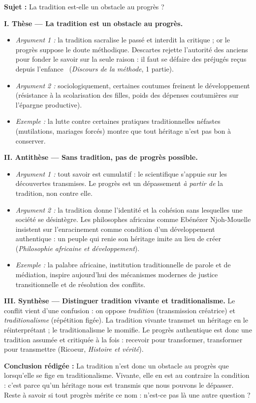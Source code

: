 \documentclass[11pt]{article}
\begin{document}
\begin{exoresolu}
\textbf{Sujet :} La tradition est-elle un obstacle au progrès ?

\tcblower
\textbf{I. Thèse — La tradition est un obstacle au progrès.}
\begin{itemize}
\item \emph{Argument 1 :} la tradition sacralise le passé et interdit la critique ; or le progrès suppose le doute méthodique. Descartes rejette l'autorité des anciens pour fonder le savoir sur la seule raison : il faut se défaire des \guillemotleft préjugés reçus depuis l'enfance \guillemotright\ (\emph{Discours de la méthode}, 1 partie).
\item \emph{Argument 2 :} sociologiquement, certaines coutumes freinent le développement (résistance à la scolarisation des filles, poids des dépenses coutumières sur l'épargne productive).
\item \emph{Exemple :} la lutte contre certaines pratiques traditionnelles néfastes (mutilations, mariages forcés) montre que tout héritage n'est pas bon à conserver.
\end{itemize}

\textbf{II. Antithèse — Sans tradition, pas de progrès possible.}
\begin{itemize}
\item \emph{Argument 1 :} tout savoir est cumulatif : le scientifique s'appuie sur les découvertes transmises. Le progrès est un dépassement \emph{à partir de} la tradition, non contre elle.
\item \emph{Argument 2 :} la tradition donne l'identité et la cohésion sans lesquelles une société se désintègre. Les philosophes africains comme Ebénézer Njoh-Mouelle insistent sur l'enracinement comme condition d'un développement authentique : un peuple qui renie son héritage imite au lieu de créer (\emph{Philosophie africaine et développement}).
\item \emph{Exemple :} la palabre africaine, institution traditionnelle de parole et de médiation, inspire aujourd'hui des mécanismes modernes de justice transitionnelle et de résolution des conflits.
\end{itemize}

\textbf{III. Synthèse — Distinguer tradition vivante et traditionalisme.}
Le conflit vient d'une confusion : on oppose \emph{tradition} (transmission créatrice) et \emph{traditionalisme} (répétition figée). La tradition vivante transmet un héritage en le réinterprétant ; le traditionalisme le momifie. Le progrès authentique est donc une tradition assumée et critiquée à la fois : recevoir pour transformer, transformer pour transmettre (Ricoeur, \emph{Histoire et vérité}).

\textbf{Conclusion rédigée :} \guillemotleft La tradition n'est donc un obstacle au progrès que lorsqu'elle se fige en traditionalisme. Vivante, elle en est au contraire la condition : c'est parce qu'un héritage nous est transmis que nous pouvons le dépasser. Reste à savoir si tout progrès mérite ce nom : n'est-ce pas là une autre question ? \guillemotright
\end{exoresolu}
\end{document}
